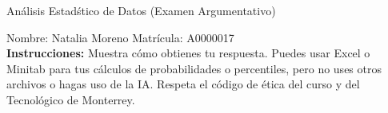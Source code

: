 \documentclass[8pt]{report}
\begin{document}
\newpage



\begin{center}
{An\'alisis Estad\'stico de Datos (Examen Argumentativo)}
\end{center}

Nombre: \underline{\hspace*{.2in}}
Natalia Moreno
\underline{\hspace*{.2in}} \quad Matr\'icula:\underline{\hspace*{.2in}}
A0000017
\underline{\hspace*{.2in}} \\

{\bf Instrucciones:} Muestra c\'omo obtienes tu respuesta. Puedes usar Excel 
o Minitab para tus cálculos de probabilidades o 
percentiles, pero no uses otros archivos o hagas uso de la IA. Respeta el 
c\'odigo de \'etica del curso y del Tecnol\'ogico 
de Monterrey.
\end{document}
